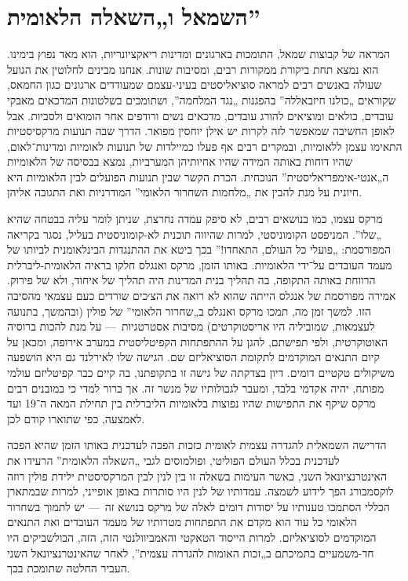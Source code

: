\section*{השמאל ו„השאלה הלאומית”}

המראה של קבוצות שמאל, התומכות בארגונים ומדינות ריאקציונריות, הוא מאד נפוץ בימינו. הוא נמצא תחת ביקורת ממקורות רבים, ומסיבות שונות. אנחנו מבינים לחלוטין את הגועל שעולה באנשים רבים למראה סוציאליסטים בעיני-עצמם שמעודדים ארגונים כגון החמאס, שקוראים „כולנו חיזבאללה” בהפגנות „נגד המלחמה”, ושתומכים בשלטונות המדכאים מאבקי עובדים, כולאים ומוציאים להורג עובדים, מדכאים נשים ורודפים אחר הומואים ולסביות. אבל לאופן החשיבה שמאפשר לזה לקרות יש אילן יוחסין מפואר. הדרך שבה תנועות מרקסיסטיות התאימו עצמן ללאומיות, ובמקרים רבים אף פעלו כמיילדות של תנועות לאומיות ומדינות־לאום, שהיו דוחות באותה המידה שהיו אחיותיהן המערביות, נמצא בבסיסה של הלאומיות ה„אנטי-אימפריאליסטית” הנוכחית. הכרת הקשר שבין תנועות הפועלים לבין הלאומיות היא חיונית על מנת להבין את „מלחמות השחרור הלאומי” המודרניות ואת התגובה אליהן.

מרקס עצמו, כמו בנושאים רבים, לא סיפק עמדה נחרצת, שניתן לומר עליה בבטחה שהיא „שלו”. המניפסט הקומוניסטי, למרות שהיווה תוכנית לא-קומוניסטית בעליל, נסגר בקריאה המפורסמת: „פועלי כל העולם, התאחדו!” בכך ביטא את ההתנגדות הבינלאומנית לביותו של מעמד העובדים על־ידי הלאומיות. באותו הזמן, מרקס ואנגלס חלקו בראיה הלאומית-ליברלית הרווחת באותה התקופה, בה תהליך בנית המדינות היה תהליך של איחוד, ולא של פירוק. אמירה מפורסמת של אנגלס הייתה שהוא לא רואה את הצ׳כים שורדים כעם עצמאי מהסיבה הזו. למשך זמן מה, תמכו מרקס ואנגלס ב„שחרור הלאומי” של פולין (ובהמשך, בתנועה לעצמאות, שמוביליה היו אריסטוקרטים) מסיבות אסטרטגיות~— על מנת להכות ברוסיה האוטוקרטית, ולפי תפישתם, להגן על ההתפתחות הקפיטליסטית במערב אירופה, ומכאן על קיום התנאים המוקדמים לתקומת הסוציאליזם שם. הגישה שלו לאירלנד גם היא הושפעה משיקולים טקטיים דומים. דיון בצדקתה של גישה זו בתקופתנו, בה קיים כבר קפיטליזם עולמי מפותח, יהיה אקדמי בלבד, ומעבר לגבולותיו של מנשר זה. אך ברור למדי כי במובנים רבים מרקס שיקף את התפישות שהיו נפוצות בלאומיות הליברלית בין תחילת המאה ה־19 ועד לאמצעה, כפי שתוארו קודם לכן.

הדרישה השמאלית להגדרה עצמית לאומית כזכות הפכה לעדכנית באותו הזמן שהיא הפכה לעדכנית בכלל העולם הפוליטי, ופולמוסים לגבי „השאלה הלאומית” הרעידו את האינטרנציונאל השני, כאשר העימות בשאלה זו בין לנין לבין המרקסיסטית ילידת פולין רוזה לוקסמבורג הפך לידוע לשמצה. עמדותיו של לנין היו סותרות באופן אופייני, למרות שבמתארן הכללי הסתמכו טענותיו על יסודות דומים לאלה של מרקס בנושא זה~— יש לתמוך בשחרור הלאומי כל עוד הוא מקדם את התפתחות מטרותיו של מעמד העובדים ואת התנאים המוקדמים לסוציאליזם. למרות הייסוד הטאקטי והאמביוולנטי הזה, הזה, הבולשביקים היו חד-משמעיים בתמיכתם ב„זכות האומות להגדרה עצמית”, לאחר שהאינטרנציונאל השני העביר החלטה שתומכת בכך.

